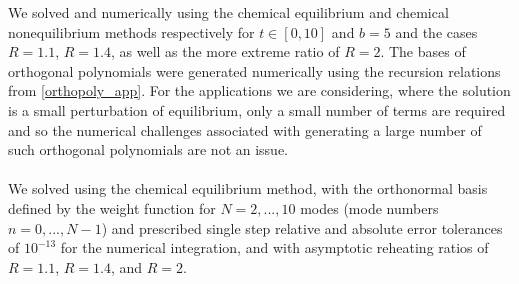 We solved  and  numerically using the chemical equilibrium and chemical nonequilibrium methods respectively for $t\in[0,10]$ and $b=5$ and the cases $R=1.1$, $R=1.4$, as well as the more extreme ratio of $R=2$.  The bases of orthogonal polynomials were generated numerically using the recursion relations from \ref{orthopoly_app}.  For the applications we are considering, where the solution is a small perturbation of equilibrium, only a small number of terms are required and so the numerical challenges associated with generating a large number of such orthogonal polynomials are not an issue.\\

\\
We solved  using the chemical equilibrium method, with the orthonormal basis defined by the weight function  for $N=2,...,10$ modes (mode numbers $n=0,...,N-1$) and prescribed  single step relative and absolute error tolerances of $10^{-13}$ for the numerical integration, and with asymptotic reheating ratios of $R=1.1$, $R=1.4$, and $R=2$.   



